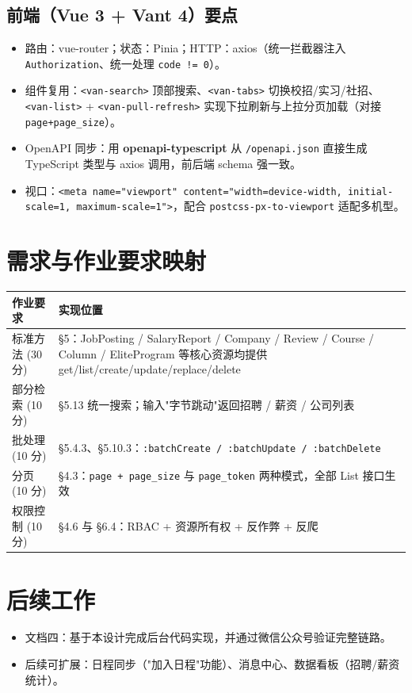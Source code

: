 \documentclass[11pt,a4paper]{ctexart}
\begin{document}
\subsection{前端（Vue 3 + Vant 4）要点}
\begin{itemize}[leftmargin=2em]
    \item 路由：vue-router；状态：Pinia；HTTP：axios（统一拦截器注入 \texttt{Authorization}、统一处理 \texttt{code != 0}）。
    \item 组件复用：\texttt{<van-search>} 顶部搜索、\texttt{<van-tabs>} 切换校招/实习/社招、\texttt{<van-list>} + \texttt{<van-pull-refresh>} 实现下拉刷新与上拉分页加载（对接 \texttt{page+page\_size}）。
    \item OpenAPI 同步：用 \textbf{openapi-typescript} 从 \texttt{/openapi.json} 直接生成 TypeScript 类型与 axios 调用，前后端 schema 强一致。
    \item 视口：\texttt{<meta name="viewport" content="width=device-width, initial-scale=1, maximum-scale=1">}，配合 \texttt{postcss-px-to-viewport} 适配多机型。
\end{itemize}

\section{需求与作业要求映射}

\begin{tabularx}{\textwidth}{p{3.5cm}X}
\toprule
作业要求 & 实现位置\\
\midrule
标准方法 (30 分) & \S 5：JobPosting / SalaryReport / Company / Review / Course / Column / EliteProgram 等核心资源均提供 get/list/create/update/replace/delete\\
部分检索 (10 分) & \S 5.13 统一搜索；输入"字节跳动"返回招聘 / 薪资 / 公司列表\\
批处理 (10 分) & \S 5.4.3、\S 5.10.3：\texttt{:batchCreate / :batchUpdate / :batchDelete}\\
分页 (10 分) & \S 4.3：\texttt{page + page\_size} 与 \texttt{page\_token} 两种模式，全部 List 接口生效\\
权限控制 (10 分) & \S 4.6 与 \S 6.4：RBAC + 资源所有权 + 反作弊 + 反爬\\
\bottomrule
\end{tabularx}

\section{后续工作}
\begin{itemize}[leftmargin=2em]
    \item 文档四：基于本设计完成后台代码实现，并通过微信公众号验证完整链路。
    \item 后续可扩展：日程同步（"加入日程"功能）、消息中心、数据看板（招聘/薪资统计）。
\end{itemize}
\end{document}
